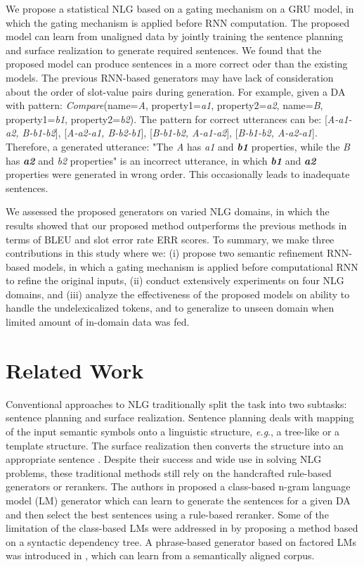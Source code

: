 \documentclass{llncs}
\begin{document}
We propose a statistical NLG based on a gating mechanism on a GRU model, in which the gating mechanism is applied before RNN computation. The proposed model can learn from unaligned data by jointly training the sentence planning and surface realization to generate required sentences. 
We found that the proposed model can produce sentences in a more correct oder than the existing models. The previous RNN-based generators may have lack of consideration about the order of slot-value pairs during generation. For example, given a DA with pattern: \textit{Compare}(name=\textit{A}, property1=\textit{a1}, property2=\textit{a2}, name=\textit{B}, property1=\textit{b1}, property2=\textit{b2}). The pattern for correct utterances can be: [\textit{A-a1-a2, B-b1-b2}], [\textit{A-a2-a1, B-b2-b1}], [\textit{B-b1-b2, A-a1-a2}], [\textit{B-b1-b2, A-a2-a1}]. Therefore, a generated utterance: "The \textit{A} has \textit{a1} and \textit{\textbf{b1}} properties, while the \textit{B} has \textit{\textbf{a2}} and \textit{b2} properties" is an incorrect utterance, in which \textit{\textbf{b1}} and \textit{\textbf{a2}} properties were generated in wrong order. This occasionally leads to inadequate sentences. 

We assessed the proposed generators on varied NLG domains, in which the results showed that our proposed method outperforms the previous methods in terms of BLEU \cite{papineni2002bleu} and slot error rate ERR \cite{wensclstm15} scores. To summary, we make three contributions in this study where we: (i) propose two semantic refinement RNN-based models, in which a gating mechanism is applied before computational RNN to refine the original inputs, (ii) conduct extensively experiments on four NLG domains, and (iii) analyze the effectiveness of the proposed models on ability to handle the undelexicalized tokens, and to generalize to unseen domain when limited amount of in-domain data was fed.

\section{Related Work}\label{sec:relatedwork}
Conventional approaches to NLG traditionally split the task into two subtasks: sentence planning and surface realization. Sentence planning deals with mapping of the input semantic symbols onto a linguistic structure, \textit{e.g}., a tree-like or a template structure. The surface realization then converts the structure into an appropriate sentence \cite{stent2004trainable}. Despite their success and wide use in solving NLG problems, these traditional methods still rely on the handcrafted rule-based generators or rerankers. The authors in \cite{oh2000stochastic} proposed a class-based n-gram language model (LM) generator which can learn to generate the sentences for a given DA and then select the best sentences using a rule-based reranker. Some of the limitation of the class-based LMs were addressed in \cite{ratnaparkhi2000trainable} by proposing a method based on a syntactic dependency tree. A phrase-based generator based on factored LMs was introduced in \cite{mairesse2014stochastic}, which can learn from a semantically aligned corpus. 
\end{document}
